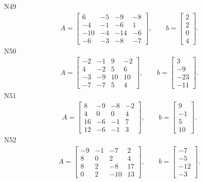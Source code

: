 \documentclass[11pt]{report}
\begin{document}
N49
\begin{align*}
 A = \left[\begin{matrix}6 & -5 & -9 & -8\\-4 & -1 & -6 & 1\\-10 & -4 & -14 & -6\\-6 & -3 & -8 & -7\end{matrix}\right],
\qquad b = \left[\begin{matrix}2\\2\\0\\4\end{matrix}\right]. 
 \end{align*}
N50
\begin{align*}
 A = \left[\begin{matrix}-2 & -1 & 9 & -2\\4 & -2 & 5 & 6\\-3 & -9 & 10 & 10\\-7 & -7 & 5 & 4\end{matrix}\right],
\qquad b = \left[\begin{matrix}3\\-9\\-23\\-11\end{matrix}\right]. 
 \end{align*}
N51
\begin{align*}
 A = \left[\begin{matrix}8 & -9 & -8 & -2\\4 & 0 & 0 & 4\\16 & -6 & -1 & 7\\12 & -6 & -1 & 3\end{matrix}\right],
\qquad b = \left[\begin{matrix}9\\-1\\5\\10\end{matrix}\right]. 
 \end{align*}
N52
\begin{align*}
 A = \left[\begin{matrix}-9 & -1 & -7 & 2\\8 & 0 & 2 & 4\\8 & 2 & -8 & 17\\0 & 2 & -10 & 13\end{matrix}\right],
\qquad b = \left[\begin{matrix}-7\\-5\\-12\\-3\end{matrix}\right]. 
 \end{align*}
\end{document}
